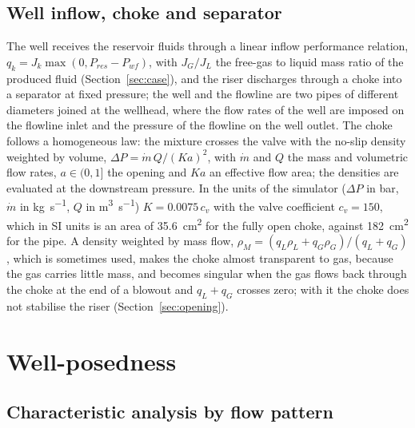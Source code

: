 \documentclass[a4paper,fleqn]{cas-sc}
\begin{document}
\subsection{Well inflow, choke and separator}\label{sec:bc}

The well receives the reservoir fluids through a linear inflow performance relation, $q_k = J_k\max(0, P_{res} - P_{wf})$, with $J_G/J_L$ the free-gas to liquid mass ratio of the produced fluid (Section~\ref{sec:case}), and the riser discharges through a choke into a separator at fixed pressure; the well and the flowline are two pipes of different diameters joined at the wellhead, where the flow rates of the well are imposed on the flowline inlet and the pressure of the flowline on the well outlet. The choke follows a homogeneous law: the mixture crosses the valve with the no-slip density weighted by volume, $\Delta P = \dot m\, Q/(K a)^2$, with $\dot m$ and $Q$ the mass and volumetric flow rates, $a \in (0, 1]$ the opening and $K a$ an effective flow area; the densities are evaluated at the downstream pressure. In the units of the simulator ($\Delta P$ in bar, $\dot m$ in \si{\kilogram\per\second}, $Q$ in \si{\cubic\metre\per\second}) $K = 0.0075\,c_v$ with the valve coefficient $c_v = 150$, which in SI units is an area of \SI{35.6}{\square\centi\metre} for the fully open choke, against \SI{182}{\square\centi\metre} for the pipe. A density weighted by mass flow, $\rho_M = (q_L\rho_L + q_G\rho_G)/(q_L + q_G)$, which is sometimes used, makes the choke almost transparent to gas, because the gas carries little mass, and becomes singular when the gas flows back through the choke at the end of a blowout and $q_L + q_G$ crosses zero; with it the choke does not stabilise the riser (Section~\ref{sec:opening}).

\section{Well-posedness}\label{sec:wellposed}

\subsection{Characteristic analysis by flow pattern}\label{sec:characteristics}
\end{document}
